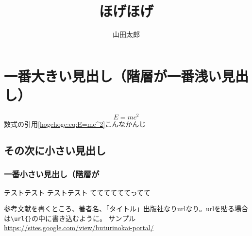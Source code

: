 \documentclass[a4paper,oneside]{jsbook}
\begin{document}
\title{ほげほげ}
\author{山田太郎}
\date{}%
\maketitle


\section{一番大きい見出し（階層が一番浅い見出し）}
\begin{equation}
  E=mc^2\label{hogehoge:eq:E=mc^2}
\end{equation}
数式の引用\eqref{hogehoge:eq:E=mc^2}こんなかんじ

\subsection{その次に小さい見出し}

\subsubsection{一番小さい見出し（階層が}
テストテスト
テストテスト
ててててててってて





\let\oldaddcontentsline\addcontentsline%
\renewcommand{\addcontentsline}[3]{}
\begin{thebibliography}{99}
    参考文献を書くところ、著者名、「タイトル」出版社なりurlなり。urlを貼る場合は\verb|\url{}|の中に書き込むように。
    サンプル\url{https://sites.google.com/view/buturinokai-portal/}
\end{thebibliography}
\let\addcontentsline\oldaddcontentsline
\end{document}
